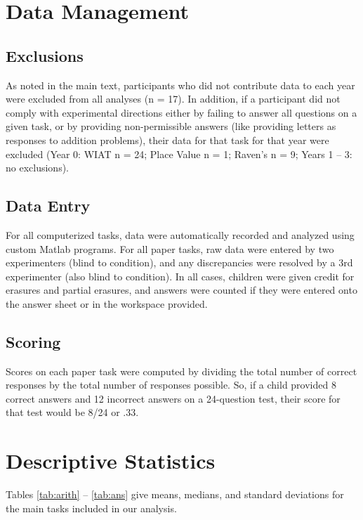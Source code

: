 \documentclass[11pt]{article}
\begin{document}
\section{Data Management}

\subsection{Exclusions}

As noted in the main text, participants who did not contribute data to each year were excluded from all analyses (n = 17). In addition, if a participant did not comply with experimental directions either by failing to answer all questions on a given task, or by providing non-permissible answers (like providing letters as responses to addition problems), their data for that task for that year were excluded (Year 0: WIAT n = 24; Place Value n = 1; Raven's n = 9; Years 1 -- 3: no exclusions).

\subsection{Data Entry}

For all computerized tasks, data were automatically recorded and analyzed using custom Matlab programs. For all paper tasks, raw data were entered by two experimenters (blind to condition), and any discrepancies were resolved by a 3rd experimenter (also blind to condition). In all cases, children were given credit for erasures and partial erasures, and answers were counted if they were entered onto the answer sheet or in the workspace provided. 

\subsection{Scoring}

Scores on each paper task were computed by dividing the total number of correct responses by the total number of responses possible. So, if a child provided 8 correct answers and 12 incorrect answers on a 24-question test, their score for that test would be 8/24 or .33. 

\section{Descriptive Statistics}

Tables \ref{tab:arith} -- \ref{tab:ans} give means, medians, and standard deviations for the main tasks included in our analysis. 
\end{document}
